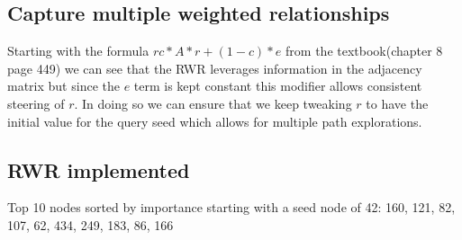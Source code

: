 \documentclass[11pt]{article}
\begin{document}
\subsection{Capture multiple weighted relationships}
Starting with the formula $r c*A*r +(1-c)*e$ from the textbook(chapter 8 page 449) we can see that the RWR leverages information in the adjacency matrix but since the $e$ term is kept constant this modifier allows consistent steering of $r$. In doing so we can ensure that we keep tweaking $r$ to have the initial value for the query seed which allows for multiple path explorations.  
\subsection{RWR implemented}
Top 10 nodes sorted by importance starting with a seed node of 42: 160, 121, 82, 107, 62, 434, 249, 183, 86, 166
\end{document}
